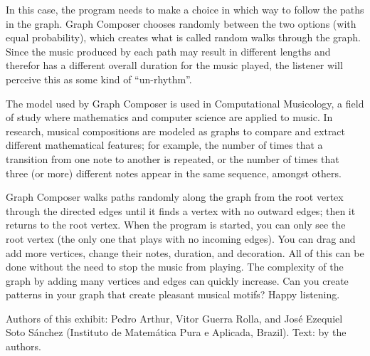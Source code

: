 In this case, the program needs to make a choice in which way to follow the paths in the graph. Graph Composer chooses randomly between the two options (with equal probability), which creates what is called random walks through the graph. Since the music produced by each path may result in different lengths and therefor has a different overall duration for the music played, the listener will perceive this as some kind of ``un-rhythm''.

The model used by Graph Composer is used in Computational Musicology, a field of study where mathematics and computer science are applied to music. In research, musical compositions are modeled as graphs to compare and extract different mathematical features; for example, the number of times that a transition from one note to another is repeated, or the number of times that three (or more) different notes appear in the same sequence, amongst others.

Graph Composer walks paths randomly along the graph from the root vertex through the directed edges until it finds a vertex with no outward edges; then it returns to the root vertex. When the program is started, you can only see the root vertex (the only one that plays with no incoming edges). You can drag and add more vertices, change their notes, duration, and decoration. All of this can be done without the need to stop the music from playing. The complexity of the graph by adding many vertices and edges can quickly increase. Can you create patterns in your graph that create pleasant musical motifs? Happy listening.

\vfill

Authors of this exhibit: Pedro Arthur, Vitor Guerra Rolla, and José Ezequiel Soto Sánchez (Instituto de Matemática Pura e Aplicada, Brazil). 
Text: by the authors.

